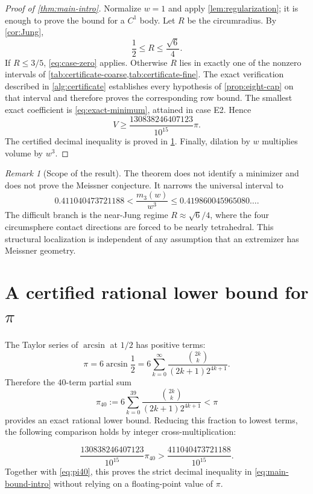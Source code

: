 \documentclass[11pt,reqno]{amsart}
\numberwithin{equation}{section}
\theoremstyle{definition}
\theoremstyle{remark}
\newtheorem{remark}[theorem]{Remark}
\begin{document}
\begin{proof}[Proof of \cref{thm:main-intro}]
Normalize $w=1$ and apply \cref{lem:regularization}; it is enough to prove the bound for a $C^{1}$ body. Let $R$ be the circumradius. By \cref{cor:Jung},
\[
 \frac12\leq R\leq\frac{\sqrt6}{4}.
\]
If $R\leq3/5$, \eqref{eq:case-zero} applies. Otherwise $R$ lies in exactly one of the nonzero intervals of \cref{tab:certificate-coarse,tab:certificate-fine}. The exact verification described in \cref{alg:certificate} establishes every hypothesis of \cref{prop:eight-cap} on that interval and therefore proves the corresponding row bound. The smallest exact coefficient is \eqref{eq:exact-minimum}, attained in case E2. Hence
\[
 V\geq \frac{130838246407123}{10^{15}}\pi.
\]
The certified decimal inequality is proved in \cref{app:pi}. Finally, dilation by $w$ multiplies volume by $w^{3}$.
\end{proof}

\begin{remark}[Scope of the result]\label{rem:scope}
The theorem does not identify a minimizer and does not prove the Meissner conjecture. It narrows the universal interval to
\[
 0.411040473721188
 < \frac{m_3(w)}{w^{3}}
 \leq 0.419860045965080\ldots.
\]
The difficult branch is the near-Jung regime $R\approx\sqrt6/4$, where the four circumsphere contact directions are forced to be nearly tetrahedral. This structural localization is independent of any assumption that an extremizer has Meissner geometry.
\end{remark}

\appendix

\section{A certified rational lower bound for \texorpdfstring{$\pi$}{pi}}\label{app:pi}

The Taylor series of $\arcsin$ at $1/2$ has positive terms:
\[
 \pi=6\arcsin\frac12
 =6\sum_{k=0}^{\infty}
 \frac{\binom{2k}{k}}{(2k+1)2^{4k+1}}.
\]
Therefore the $40$-term partial sum
\begin{equation}\label{eq:pi40}
 \pi_{40}:=
 6\sum_{k=0}^{39}
 \frac{\binom{2k}{k}}{(2k+1)2^{4k+1}}
 <\pi
\end{equation}
provides an exact rational lower bound. Reducing this fraction to lowest terms, the following comparison holds by integer cross-multiplication:

\[
 \frac{130838246407123}{10^{15}}\pi_{40}
 >\frac{411040473721188}{10^{15}}.
\]
Together with \eqref{eq:pi40}, this proves the strict decimal inequality in \eqref{eq:main-bound-intro} without relying on a floating-point value of $\pi$.
\end{document}
